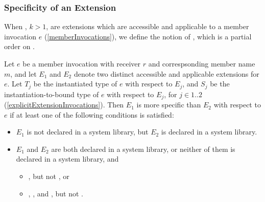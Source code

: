 \documentclass[makeidx]{article}
\begin{document}


\subsubsection{Specificity of an Extension}

\LMHash{}%
%
When , $k > 1$, are extensions
which are accessible and applicable to a member invocation $e$
(\ref{memberInvocations}),
we define the notion of
,
which is a partial order on .


\LMHash{}%
%
Let $e$ be a member invocation with receiver $r$
and correspsonding member name $m$,
%
and let $E_1$ and $E_2$ denote two distinct
accessible and applicable extensions for $e$.
%
Let $T_j$ be the instantiated \ON{} type of $e$ with respect to $E_j$,
and $S_j$ be the instantiation-to-bound \ON{} type of $e$ with respect to $E_j$,
for $j \in 1 .. 2$
(\ref{explicitExtensionInvocations}).
Then $E_1$ is more specific than $E_2$ with respect to $e$
if at least one of the following conditions is satisfied:

\begin{itemize}
\item
  $E_1$ is not declared in a system library,
  but $E_2$ is declared in a system library.
\item
  $E_1$ and $E_2$ are both declared in a system library,
  or neither of them is declared in a system library, and

  \begin{itemize}
  \item {}, but not , or
  \item {}, , and
    , but not .
  \end{itemize}

\end{itemize}
\end{document}
